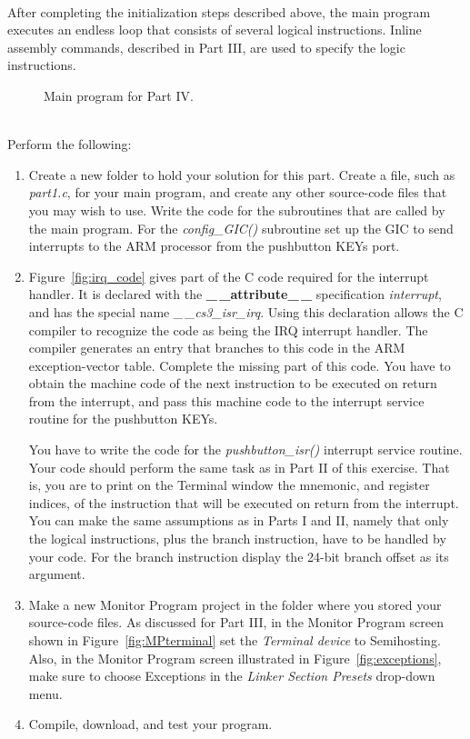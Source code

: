 \documentclass[epsfig,10pt,fullpage]{article}
\begin{document}
~\\
\noindent
After completing the initialization steps
described above, the main program executes an endless loop that consists of several
logical instructions. Inline assembly commands, described in Part III, are used to specify 
the logic instructions.

\clearpage
\begin{figure}[H]
\begin{center}

\end{center}
\caption{Main program for Part IV.}
\label{fig:C_code2}
\end{figure}

~\\
\noindent
Perform the following:

\begin{enumerate}
\item Create a new folder to hold your solution for this part. Create a
file, such as {\it part1.c}, for your main program, and create any other source-code files 
that you may wish to use.  Write the code for the subroutines that are called by the 
main program. For the {\it config\_GIC()} subroutine set up the
GIC to send interrupts to the ARM processor from the pushbutton KEYs port. 

\item 
Figure~\ref{fig:irq_code} gives part of the C code required for the interrupt handler. 
It is declared with the {\bf \_$\,$\_attribute\_$\,$\_} specification {\it interrupt}, 
and has the special name 
{\it \_$\,$\_cs3\_isr\_irq}.  Using this declaration allows the C compiler to recognize the 
code as being the IRQ interrupt handler. The compiler generates an entry that branches to
this code in the ARM exception-vector table. Complete the missing part of this code. You
have to obtain the machine code of the next instruction to be executed on return from the 
interrupt, and pass this machine code to the interrupt service routine for the
pushbutton KEYs.
  
You have to write the code for the {\it pushbutton\_isr()} interrupt service routine.
Your code should perform the same task as in Part II of this exercise. That is, you are to
print on the Terminal window the mnemonic, and register indices, of the instruction that 
will be executed on return from the interrupt. You can make the same assumptions as in
Parts I and II, namely that only the logical instructions, plus the branch instruction,
have to be handled by your code. For the branch instruction display the 24-bit branch
offset as its argument.

\item
Make a new Monitor Program project in the folder where you stored your source-code files.
As discussed for Part III, in the Monitor Program screen shown in 
Figure~\ref{fig:MPterminal} set the {\it Terminal device} to {\sf Semihosting}.
Also, in the Monitor Program screen illustrated in Figure~\ref{fig:exceptions}, make sure 
to choose {\sf Exceptions} in the {\it Linker Section Presets} drop-down menu.

\item
Compile, download, and test your program. 
\end{enumerate}
\end{document}
